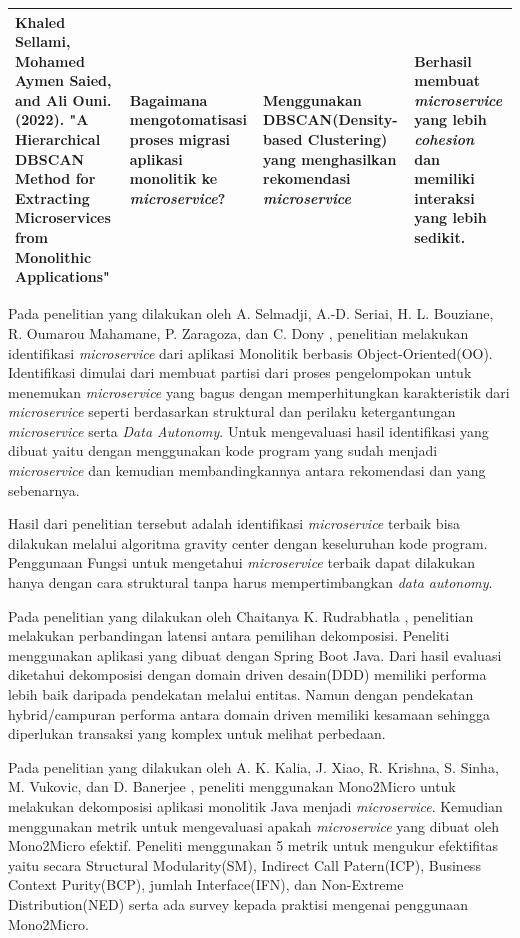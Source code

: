 \begin{small}
\begin{longtable}{|p{3cm}|p{3.5cm}|p{3cm}|p{3.5cm}|}
		\hline
		Khaled Sellami, Mohamed Aymen Saied, and Ali Ouni. (2022). "\textbf{A Hierarchical
		DBSCAN Method for Extracting Microservices from Monolithic Applications}" \cite{ECD} &
		Bagaimana mengotomatisasi proses migrasi aplikasi monolitik ke \textit{microservice}?  &
	    Menggunakan DBSCAN(Density-based Clustering) yang menghasilkan rekomendasi \textit{microservice}  &
		Berhasil membuat \textit{microservice} yang lebih \textit{cohesion} dan memiliki interaksi yang lebih sedikit. 
		\\
		\hline
	\end{longtable}
\end{small}
\endgroup
Pada penelitian yang dilakukan oleh  A. Selmadji, A.-D. Seriai, H. L. Bouziane, R. Oumarou Mahamane, P. Zaragoza, dan C. Dony \cite{5B1}, penelitian melakukan identifikasi \textit{microservice} dari aplikasi Monolitik berbasis Object-Oriented(OO). Identifikasi  dimulai dari membuat partisi dari proses pengelompokan untuk menemukan \textit{microservice} yang bagus dengan memperhitungkan karakteristik dari \textit{microservice} seperti berdasarkan struktural dan perilaku ketergantungan \textit{microservice} serta \textit{Data Autonomy}. Untuk mengevaluasi hasil identifikasi yang dibuat yaitu dengan menggunakan kode program yang sudah menjadi \textit{microservice} dan kemudian membandingkannya antara rekomendasi dan yang sebenarnya. 

Hasil dari penelitian tersebut adalah identifikasi \textit{microservice} terbaik bisa dilakukan melalui algoritma gravity center dengan keseluruhan kode program. Penggunaan Fungsi untuk mengetahui \textit{microservice} terbaik dapat dilakukan hanya dengan cara struktural tanpa harus mempertimbangkan \textit{data autonomy}.

Pada penelitian yang dilakukan oleh Chaitanya K. Rudrabhatla \cite{6C1}, penelitian melakukan perbandingan latensi antara pemilihan dekomposisi. Peneliti menggunakan aplikasi yang dibuat dengan Spring Boot Java. Dari hasil evaluasi diketahui dekomposisi dengan domain driven desain(DDD)  memiliki performa lebih baik daripada pendekatan melalui entitas. Namun dengan pendekatan hybrid/campuran performa antara domain driven memiliki kesamaan sehingga diperlukan transaksi yang komplex untuk melihat perbedaan.

Pada penelitian yang dilakukan oleh A. K. Kalia, J. Xiao, R. Krishna, S. Sinha, M. Vukovic, dan D. Banerjee \cite{8EA}, peneliti menggunakan Mono2Micro untuk melakukan dekomposisi aplikasi monolitik Java menjadi \textit{microservice}. Kemudian menggunakan metrik untuk mengevaluasi apakah \textit{microservice} yang dibuat oleh Mono2Micro efektif. Peneliti menggunakan 5 metrik untuk mengukur efektifitas yaitu  secara Structural Modularity(SM), Indirect Call Patern(ICP), Business Context Purity(BCP), jumlah Interface(IFN), dan Non-Extreme Distribution(NED) serta ada survey kepada praktisi mengenai penggunaan Mono2Micro.

